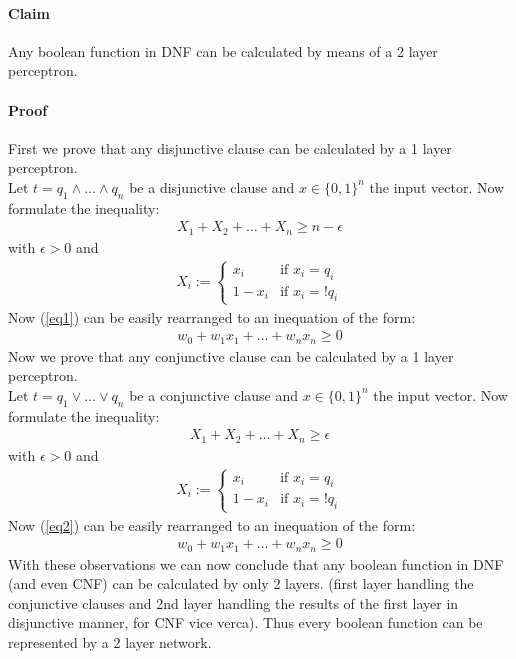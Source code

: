\paragraph{Claim}
Any boolean function in DNF can be calculated by means of a 2 layer perceptron.

\paragraph{Proof}
First we prove that any disjunctive clause can be calculated by a 1 layer perceptron.\\
Let $t = q_1 \wedge \ldots \wedge q_n$ be a disjunctive clause and $x\in\{0,1\}^n$ the input vector. Now formulate the inequality:
\begin{align}
	X_1 + X_2 + \ldots +X_n \geq n -\epsilon
	\label{eq1}
\end{align}
with $\epsilon > 0$ and
\begin{align*}
X_i := 
\begin{cases} 
	x _i &\mbox{if } x_i = q_i  \\ 
	1-x _i &\mbox{if } x_i = !q_i
\end{cases} 
\end{align*}
Now (\ref{eq1}) can be easily rearranged to an inequation of the form:
\begin{align*}
	w_0 + w_1x_1 + \ldots + w_nx_n \geq 0
\end{align*}
Now we prove that any conjunctive clause can be calculated by a 1 layer perceptron.\\
Let $t = q_1 \vee \ldots \vee q_n$ be a conjunctive clause and $x\in\{0,1\}^n$ the input vector. Now formulate the inequality:
\begin{align}
X_1 + X_2 + \ldots +X_n \geq \epsilon
\label{eq2}
\end{align}
with $\epsilon > 0$ and
\begin{align*}
X_i := 
\begin{cases} 
	x _i &\mbox{if } x_i = q_i  \\ 
	1-x _i &\mbox{if } x_i = !q_i
\end{cases} 
\end{align*}
Now (\ref{eq2}) can be easily rearranged to an inequation of the form:
\begin{align*}
	w_0 + w_1x_1 + \ldots + w_nx_n \geq 0
\end{align*}
With these observations we can now conclude that any boolean function in DNF (and even CNF) can be calculated by only 2 layers.
(first layer handling the conjunctive clauses and 2nd layer handling the results of the first layer in disjunctive manner, for CNF vice verca).
Thus every boolean function can be represented by a 2 layer network.

